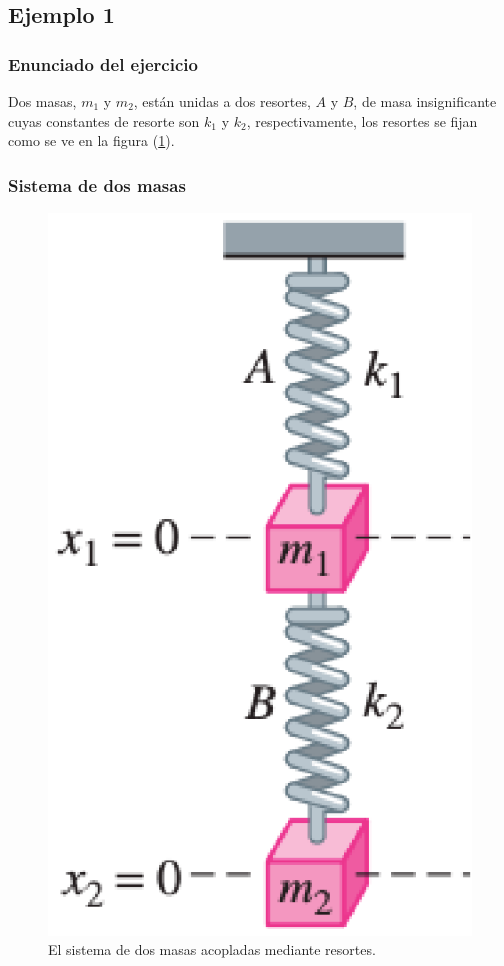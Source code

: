 \subsection{Ejemplo 1}

\begin{frame}
\frametitle{Enunciado del ejercicio}
Dos masas, $m_{1}$ y $m_{2}$, están unidas a dos resortes, $A$ y $B$, de masa insignificante cuyas constantes de resorte son $k_{1}$ y $k_{2}$, respectivamente, los resortes se fijan como se ve en la figura (\ref{fig:figura_dos_masas_01}).
\end{frame}
\begin{frame}
\frametitle{Sistema de dos masas}
\begin{figure}
    \centering
    \includegraphics[scale=0.35]{Imagenes/Ejercicio_Dos_Masas_01.eps}
    \caption{El sistema de dos masas acopladas mediante resortes.}
    \label{fig:figura_dos_masas_01}
\end{figure}
\end{frame}
